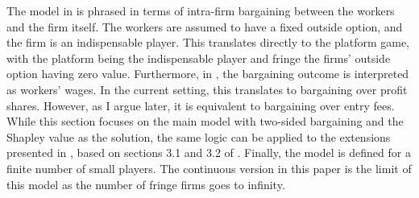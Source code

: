 The model in \textcite{stole1996intra} is phrased in terms of intra-firm bargaining between the workers and the firm itself.
The workers are assumed to have a fixed outside option, and the firm is an indispensable player.
This translates directly to the platform game, with the platform being the indispensable player and fringe the firms' outside option having zero value.
Furthermore, in \textcite{stole1996intra}, the bargaining outcome is interpreted as workers' wages.
In the current setting, this translates to bargaining over profit shares.
However, as I argue later, it is equivalent to bargaining over entry fees.
While this section focuses on the main model with two-sided bargaining and the Shapley value as the solution, the same logic can be applied to the extensions presented in , based on sections 3.1 and 3.2 of \textcite{stole1996intra}.
Finally, the model is defined for a finite number of small players.
The continuous version in this paper is the limit of this model as the number of fringe firms goes to infinity.


